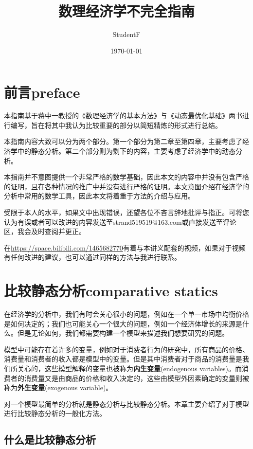 \documentclass[UTF8,12pt]{ctexart}
\title{数理经济学不完全指南} %
\author{StudentF}
\date{\today}
\numberwithin{equation}{section} %
\numberwithin{figure}{section}
\numberwithin{table}{section}
\begin{document}
	\maketitle
	\tableofcontents
	
	\newpage
	
	\section{前言preface}
	本指南基于蒋中一教授的《数理经济学的基本方法》与《动态最优化基础》两书进行编写，旨在将其中我认为比较重要的部分以简短精炼的形式进行总结。
	
	本指南内容大致可以分为两个部分。第一个部分为第二章至第四章，主要考虑了经济学中的静态分析。第二个部分则为剩下的内容，主要考虑了经济学中的动态分析。
	
	本指南并不意图提供一个非常严格的数学基础，因此本文的内容中并没有包含严格的证明，且在各种情况的推广中并没有进行严格的证明。本文意图介绍在经济学的分析中常用的数学工具，因此本文将着重于方法的介绍与应用。
	
	受限于本人的水平，如果文中出现错误，还望各位不吝言辞地批评与指正。可将您认为有误或者可以改进的内容发送至strand519519@163.com或直接发送至评论区，我会及时查阅并更正。
	
	在\href{https://space.bilibili.com/1465682770}{https://space.bilibili.com/1465682770}有着与本讲义配套的视频，如果对于视频有任何改进的建议，也可以通过同样的方法与我进行联系。
	\newpage
	
	
	\section{比较静态分析comparative statics}
	在经济学的分析中，我们有时会关心很小的问题，例如在一个单一市场中均衡价格是如何决定的；我们也可能关心一个很大的问题，例如一个经济体增长的来源是什么。但是无论如何，我们都需要构建一个模型来描述我们想要研究的问题。
	
	模型中可能存在着许多的变量，例如对于消费者行为的研究中，所有商品的价格、消费量和消费者的收入都是模型中的变量。但是其中消费者对于商品的消费量是我们所关心的，这些模型解释的变量也被称为\textbf{内生变量}(endogenous variables)。而消费者的消费量又是由商品的价格和收入决定的，这些由模型外因素确定的变量则被称为\textbf{外生变量}(exogenous variable)。
	
	对一个模型最简单的分析就是静态分析与比较静态分析。本章主要介绍了对于模型进行比较静态分析的一般化方法。
	
	
	\subsection{什么是比较静态分析}
	
\end{document}
